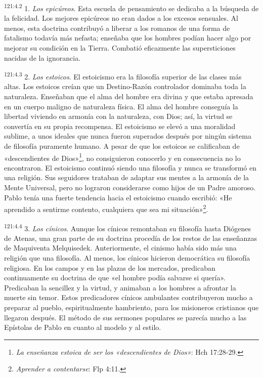\par 
\textsuperscript{121:4.2} 1. \textit{Los epicúreos}. Esta escuela de pensamiento se dedicaba a la búsqueda de la felicidad. Los mejores epicúreos no eran dados a los excesos sensuales. Al menos, esta doctrina contribuyó a liberar a los romanos de una forma de fatalismo todavía más nefasta; enseñaba que los hombres podían hacer algo por mejorar su condición en la Tierra. Combatió eficazmente las supersticiones nacidas de la ignorancia.

\par 
\textsuperscript{121:4.3} 2. \textit{Los estoicos}. El estoicismo era la filosofía superior de las clases más altas. Los estoicos creían que un Destino-Razón controlador dominaba toda la naturaleza. Enseñaban que el alma del hombre era divina y que estaba apresada en un cuerpo maligno de naturaleza física. El alma del hombre conseguía la libertad viviendo en armonía con la naturaleza, con Dios; así, la virtud se convertía en su propia recompensa. El estoicismo se elevó a una moralidad sublime, a unos ideales que nunca fueron superados después por ningún sistema de filosofía puramente humano. A pesar de que los estoicos se calificaban de «descendientes de Dios»\footnote{\textit{La enseñanza estoica de ser los «descendientes de Dios»}: Hch 17:28-29.}, no consiguieron conocerlo y en consecuencia no lo encontraron. El estoicismo continuó siendo una filosofía y nunca se transformó en una religión. Sus seguidores trataban de adaptar sus mentes a la armonía de la Mente Universal, pero no lograron considerarse como hijos de un Padre amoroso. Pablo tenía una fuerte tendencia hacia el estoicismo cuando escribió: «He aprendido a sentirme contento, cualquiera que sea mi situación»\footnote{\textit{Aprender a contentarse}: Flp 4:11.}.

\par 
\textsuperscript{121:4.4} 3. \textit{Los cínicos}. Aunque los cínicos remontaban su filosofía hasta Diógenes de Atenas, una gran parte de su doctrina procedía de los restos de las enseñanzas de Maquiventa Melquisedek. Anteriormente, el cinismo había sido más una religión que una filosofía. Al menos, los cínicos hicieron democrática su filosofía religiosa. En los campos y en las plazas de los mercados, predicaban continuamente su doctrina de que «el hombre podía salvarse si quería». Predicaban la sencillez y la virtud, y animaban a los hombres a afrontar la muerte sin temor. Estos predicadores cínicos ambulantes contribuyeron mucho a preparar al pueblo, espiritualmente hambriento, para los misioneros cristianos que llegaron después. El método de sus sermones populares se parecía mucho a las Epístolas de Pablo en cuanto al modelo y al estilo.

